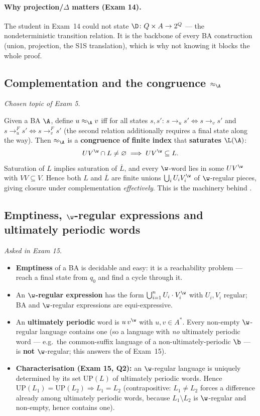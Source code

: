 \documentclass[oneside]{academica}
\begin{document}
\paragraph{Why projection/$\Delta$ matters (Exam 14).}
The student in Exam~14 could not state $\D\colon Q\times A\to 2^Q$ --- the
nondeterministic transition relation. It is the backbone of every BA
construction (union, projection, the S1S translation), which is why not
knowing it blocks the whole proof.

\subsection{Complementation and the congruence \texorpdfstring{$\approx_{\A}$}{~A}}
\emph{Chosen topic of Exam 5.}

Given a BA $\A$, define $u\approx_{\A}v$ iff for all states $s,s'$:
$s\to_u s' \iff s\to_v s'$ and $s\to_u^F s' \iff s\to_v^F s'$ (the second
relation additionally requires a final state along the way). Then
$\approx_{\A}$ is a \textbf{congruence of finite index} that
\textbf{saturates} $\L(\A)$:
\[
  UV^{\w}\cap L\neq\emptyset \;\Longrightarrow\; UV^{\w}\subseteq L .
\]
Saturation of $L$ implies saturation of $\overline{L}$, and every
$\w$-word lies in some $UV^{\w}$ with $VV\subseteq V$. Hence both $L$ and
$\overline{L}$ are finite unions $\bigcup_i U_iV_i^{\w}$ of
$\w$-regular pieces, giving closure under complementation
\emph{effectively}. This is the machinery behind .

\subsection{Emptiness, \texorpdfstring{$\w$}{omega}-regular expressions and ultimately periodic words}
\emph{Asked in Exam 15.}

\begin{itemize}
  \item \textbf{Emptiness} of a BA is decidable and easy: it is a
    reachability problem --- reach a final state from $q_0$ and find a
    cycle through it.
  \item An \textbf{$\w$-regular expression} has the form
    $\bigcup_{i=1}^n U_i\cdot V_i^{\w}$ with $U_i,V_i$ regular; BA and
    $\w$-regular expressions are equi-expressive.
  \item An \textbf{ultimately periodic} word is $u\,v^{\w}$ with
    $u,v\in A^*$. Every non-empty $\w$-regular language contains one (so
    a language with \emph{no} ultimately periodic word --- e.g.\ the
    common-suffix language of a non-ultimately-periodic $\b$ --- is
    \textbf{not} $\w$-regular; this answers the  of Exam~15).
  \item \textbf{Characterisation (Exam 15, Q2):} an $\w$-regular language
    is uniquely determined by its set $\mathrm{UP}(L)$ of ultimately
    periodic words. Hence $\mathrm{UP}(L_1)=\mathrm{UP}(L_2)\Rightarrow
    L_1=L_2$ (contrapositive: $L_1\neq L_2$ forces a difference already
    among ultimately periodic words, because $L_1\setminus L_2$ is
    $\w$-regular and non-empty, hence contains one).
\end{itemize}
\end{document}
